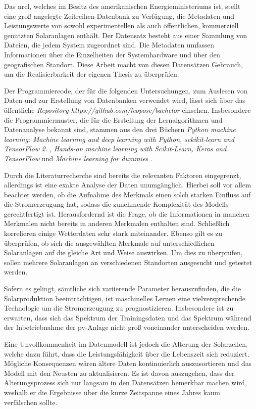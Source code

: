 \documentclass[12pt, a4paper]{article}
\begin{document}
Das \ac{nrel}, welches im Besitz des amerikanischen Energieministeriums ist, stellt eine groß angelegte Zeitreihen-Datenbank zu Verfügung, die Metadaten und Leistungswerte von sowohl experimentellen als auch öffentlichen, kommerziell genutzten Solaranlagen enthält.  Der Datensatz besteht aus einer Sammlung von Dateien, die jedem System zugeordnet sind. Die Metadaten umfassen Informationen über die Einzelheiten der Systemhardware und über den geografischen Standort. Diese Arbeit macht von diesen Datensätzen Gebrauch, um die Realisierbarkeit der eigenen Thesis zu überprüfen.

Der Programmiercode, der für die folgenden Untersuchungen, zum Auslesen von Daten und zur Erstellung von Datenbanken verwendet wird, lässt sich über das öffentliche \textit{Repository https://github.com/leoposc/bachelor} einsehen. Insbesondere die Programmiermuster, die für die Erstellung der Lernalgorithmen und Datenanalyse bekannt sind, stammen aus den drei Büchern \textit{Python machine learning: Machine learning and deep learning with Python, sckikit-learn and TensorFlow 2.} \cite{raschka2019python}, \textit{Hands-on machine learning with Scikit-Learn, Keras and TensorFlow} \cite{geron2022hands} und \textit{Machine learning for dummies} \cite{mueller2021machine}.

Durch die Literaturrecherche sind bereits die relevanten Faktoren eingegrenzt, allerdings ist eine exakte Analyse der Daten unumgänglich. Hierbei soll vor allem beachtet werden, ob die Aufnahme des Merkmals einen solch starken Einfluss auf die Stromerzeugung hat, sodass die zunehmende Komplexität des Modells gerechtfertigt ist. Herausfordernd ist die Frage, ob die Informationen in manchen Merkmalen nicht bereits in anderen Merkmalen enthalten sind. Schließlich korrelieren einige Wetterdaten sehr stark miteinander. Ebenso gilt es zu überprüfen, ob sich die ausgewählten Merkmale auf unterschiedlichen Solaranlagen auf die gleiche Art und Weise auswirken. Um dies zu überprüfen, sollen mehrere Solaranlagen an verschiedenen Standorten ausgesucht und getestet werden.

Sofern es gelingt, sämtliche sich variierende Parameter herauszufinden, die die Solarproduktion beeinträchtigen, ist maschinelles Lernen eine vielversprechende Technologie um die Stromerzeugung zu prognostizieren. Insbesondere ist zu erwarten, dass sich das Spektrum der Trainingsdaten und das Spektrum während der Inbetriebnahme der \ac{pv}-Anlage nicht groß voneinander unterscheiden werden.

Eine Unvollkommenheit im Datenmodell ist jedoch die Alterung der Solarzellen, welche dazu führt, dass die Leistungsfähigkeit über die Lebenszeit sich reduziert. Mögliche Konsequenzen wären ältere Daten kontinuierlich auszusortieren und das Modell mit den Neusten zu aktualisieren. Es ist davon auszugehen, dass der Alterungsprozess sich nur langsam in den Datensätzen bemerkbar machen wird, weshalb er die Ergebnisse über die kurze Zeitspanne eines Jahres kaum verfälschen sollte.
\end{document}
